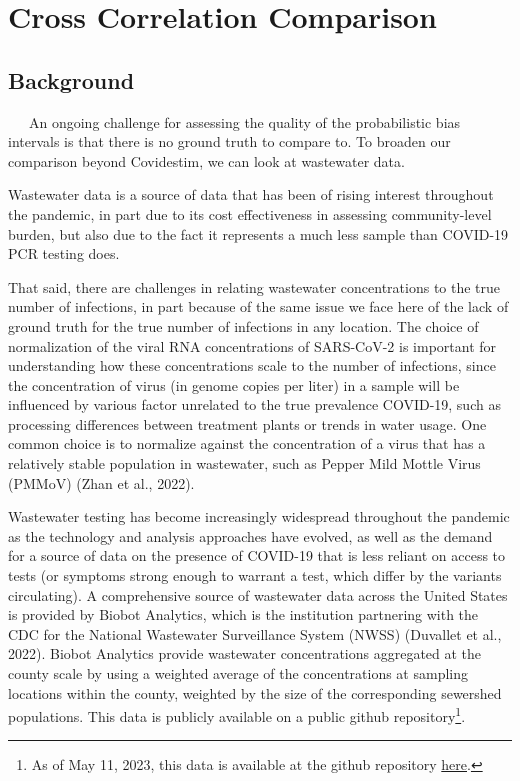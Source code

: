 \documentclass[12pt,twoside]{smiththesis}
\begin{document}
\hypertarget{cross-correlation-comparison}{%
\section{Cross Correlation Comparison}\label{cross-correlation-comparison}}

\hypertarget{background-1}{%
\subsection{Background}\label{background-1}}

~~~An ongoing challenge for assessing the quality of the probabilistic bias intervals is that there is no ground truth to compare to. To broaden our comparison beyond Covidestim, we can look at wastewater data.

Wastewater data is a source of data that has been of rising interest throughout the pandemic, in part due to its cost effectiveness in assessing community-level burden, but also due to the fact it represents a much less sample than COVID-19 PCR testing does.

That said, there are challenges in relating wastewater concentrations to the true number of infections, in part because of the same issue we face here of the lack of ground truth for the true number of infections in any location. The choice of normalization of the viral RNA concentrations of SARS-CoV-2 is important for understanding how these concentrations scale to the number of infections, since the concentration of virus (in genome copies per liter) in a sample will be influenced by various factor unrelated to the true prevalence COVID-19, such as processing differences between treatment plants or trends in water usage. One common choice is to normalize against the concentration of a virus that has a relatively stable population in wastewater, such as Pepper Mild Mottle Virus (PMMoV) (Zhan et al., 2022).

Wastewater testing has become increasingly widespread throughout the pandemic as the technology and analysis approaches have evolved, as well as the demand for a source of data on the presence of COVID-19 that is less reliant on access to tests (or symptoms strong enough to warrant a test, which differ by the variants circulating). A comprehensive source of wastewater data across the United States is provided by Biobot Analytics, which is the institution partnering with the CDC for the National Wastewater Surveillance System (NWSS) (Duvallet et al., 2022). Biobot Analytics provide wastewater concentrations aggregated at the county scale by using a weighted average of the concentrations at sampling locations within the county, weighted by the size of the corresponding sewershed populations. This data is publicly available on a public github repository\footnote{As of May 11, 2023, this data is available at the github repository \href{https://github.com/biobotanalytics/covid19-wastewater-data}{here}.}.
\end{document}
